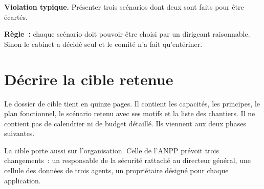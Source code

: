 \begin{boxalert}
\textbf{Violation typique.} Présenter trois scénarios dont deux sont faits pour être écartés.

\smallskip
\textbf{Règle~:} chaque scénario doit pouvoir être choisi par un dirigeant raisonnable. Sinon le cabinet a
décidé seul et le comité n'a fait qu'entériner.
\end{boxalert}

\section{Décrire la cible retenue}
\label{sec:c10-decrire}

Le dossier de cible tient en quinze pages. Il contient les capacités, les principes, le plan fonctionnel, le
scénario retenu avec ses motifs et la liste des chantiers. Il ne contient pas de calendrier ni de budget
détaillé. Ils viennent aux deux phases suivantes.

La cible porte aussi sur l'organisation. Celle de l'ANPP prévoit trois changements~: un responsable de la
sécurité rattaché au directeur général, une cellule des données de trois agents, un propriétaire désigné pour
chaque application.

